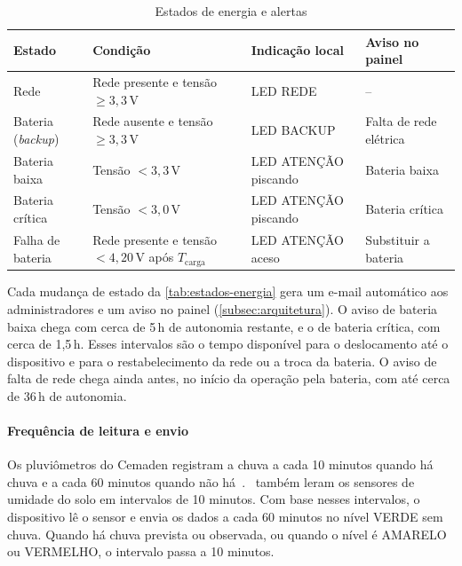 \begin{table}[H]
\centering
\caption{Estados de energia e alertas}
\label{tab:estados-energia}
\small
\begin{tabular}{p{3.0cm}p{4.6cm}p{2.8cm}p{3.6cm}}
\hline
\textbf{Estado} & \textbf{Condição} & \textbf{Indicação local} & \textbf{Aviso no painel} \\
\hline
Rede & Rede presente e tensão $\geq 3{,}3$\,V & LED REDE & -- \\
Bateria (\textit{backup}) & Rede ausente e tensão $\geq 3{,}3$\,V & LED BACKUP & Falta de rede elétrica \\
Bateria baixa & Tensão $< 3{,}3$\,V & LED ATENÇÃO piscando & Bateria baixa \\
Bateria crítica & Tensão $< 3{,}0$\,V & LED ATENÇÃO piscando & Bateria crítica \\
Falha de bateria & Rede presente e tensão $< 4{,}20$\,V após $T_{\mathrm{carga}}$ & LED ATENÇÃO aceso & Substituir a bateria \\
\hline
\end{tabular}
\end{table}

Cada mudança de estado da \autoref{tab:estados-energia} gera um e-mail
automático aos administradores e um aviso no painel
(\autoref{subsec:arquitetura}). O aviso de bateria baixa chega com cerca
de 5\,h de autonomia restante, e o de bateria crítica, com cerca de
1,5\,h. Esses intervalos são o tempo disponível para o deslocamento até o
dispositivo e para o restabelecimento da rede ou a troca da bateria.
O aviso de falta de rede chega ainda antes, no início da operação pela
bateria, com até cerca de 36\,h de autonomia.

\paragraph*{Frequência de leitura e envio}

Os pluviômetros do Cemaden registram a chuva a cada 10 minutos quando há
chuva e a cada 60 minutos quando não há~\cite[p.~3]{freitas2021analise}.~ também leram os sensores de umidade do
solo em intervalos de 10 minutos.
Com base nesses intervalos, o dispositivo lê o sensor e envia os dados a
cada 60 minutos no nível VERDE sem chuva. Quando há chuva prevista ou
observada, ou quando o nível é AMARELO ou VERMELHO, o intervalo passa a
10 minutos.

